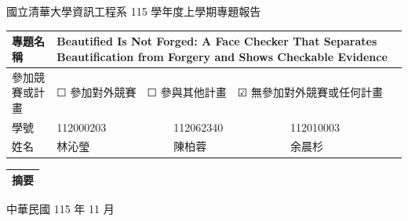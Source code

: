 \documentclass[12pt,a4paper]{article}
\begin{document}
\begin{center}
{\fontsize{16}{24}\selectfont 國立清華大學資訊工程系 115 學年度上學期專題報告}
\end{center}
\vspace{0.6em}
\noindent
\begin{tabular}{|>{\centering\arraybackslash}p{1.35in}|p{1.60in}|p{1.60in}|p{1.60in}|}
\hline
專題名稱 & \multicolumn{3}{p{5.08in}|}{Beautified Is Not Forged: A Face Checker That Separates Beautification from Forgery and Shows Checkable Evidence} \\
\hline
參加競賽或計畫 & \multicolumn{3}{p{5.08in}|}{{\symfont ☐} 參加對外競賽　{\symfont ☐} 參與其他計畫　{\symfont ☑} 無參加對外競賽或任何計畫} \\
\hline
學號 & 112000203 & 112062340 & 112010003 \\
\hline
姓名 & 林沁瑩 & 陳柏蓉 & 余晨杉 \\
\hline
\end{tabular}

\vspace{1.2em}
\noindent
\begin{tabular}{|p{6.50in}|}
\hline
{\centering\fontsize{16}{24}\selectfont 摘要\par}
\vspace{0.6em}

\vspace{0.3em} \\
\hline
\end{tabular}

\vspace{2.5em}
\begin{center}
{\fontsize{16}{24}\selectfont 中華民國 115 年 11 月}
\end{center}
\end{document}
